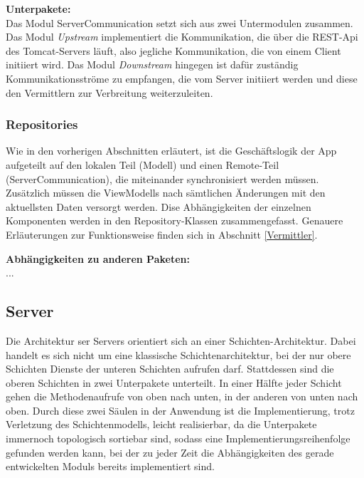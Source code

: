 \documentclass[parskip=full]{scrartcl}
\begin{document}
\textbf{Unterpakete:}\\
Das Modul ServerCommunication setzt sich aus zwei Untermodulen zusammen. Das Modul \textit{Upstream} implementiert die Kommunikation, die über die REST-Api des Tomcat-Servers läuft, also jegliche Kommunikation, die von einem Client initiiert wird. Das Modul \textit{Downstream} hingegen ist dafür zuständig Kommunikationsströme zu empfangen, die vom Server initiiert werden und diese den Vermittlern zur Verbreitung weiterzuleiten.

\subsubsection{Repositories}
Wie in den vorherigen Abschnitten erläutert, ist die Geschäftslogik der App aufgeteilt auf den lokalen Teil (Modell) und einen Remote-Teil (ServerCommunication), die miteinander synchronisiert werden müssen. Zusätzlich müssen die ViewModells nach sämtlichen Änderungen mit den aktuellsten Daten versorgt werden. Dise Abhängigkeiten der einzelnen Komponenten werden in den Repository-Klassen zusammengefasst. Genauere Erläuterungen zur Funktionsweise finden sich in Abschnitt \ref{Vermittler}.

\textbf{Abhängigkeiten zu anderen Paketen:}\\
...

\subsection{Server}
Die Architektur ser Servers orientiert sich an einer Schichten-Architektur. Dabei handelt es sich nicht um eine klassische Schichtenarchitektur, bei der nur obere Schichten Dienste der unteren Schichten aufrufen darf. Stattdessen sind die oberen Schichten in zwei Unterpakete unterteilt. In einer Hälfte jeder Schicht gehen die Methodenaufrufe von oben nach unten, in der anderen von unten nach oben. Durch diese zwei Säulen in der Anwendung ist die Implementierung, trotz Verletzung des Schichtenmodells, leicht realisierbar, da die Unterpakete immernoch topologisch sortiebar sind, sodass
eine Implementierungsreihenfolge gefunden werden kann, bei der zu jeder Zeit die Abhängigkeiten des gerade entwickelten Moduls bereits implementiert sind.
\end{document}
